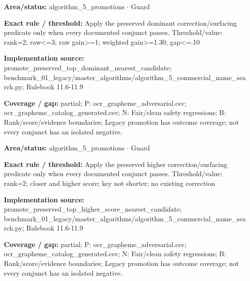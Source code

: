 \begin{tcolorbox}[enhanced,breakable,colback=white,colframe=Muted!45,boxrule=0.45pt,arc=1.5pt,left=6pt,right=6pt,top=5pt,bottom=5pt,title={\texttt{A5-PROMOTE-PRESERVED-DOMINANT}},title after break={\texttt{A5-PROMOTE-PRESERVED-DOMINANT}\ (continued)},fonttitle=\headingfont\bfseries\color{Navy},coltitle=Navy]
\textbf{Area/status:} algorithm\_\allowbreak{}5\_\allowbreak{}promotions $\boldsymbol{\cdot}$ Guard\par
\smallskip
\textbf{Exact rule / threshold:} Apply the preserved dominant correction/\allowbreak{}surfacing predicate only when every documented conjunct passes. Threshold/\allowbreak{}value: rank=2; raw<=3; raw gain>=1; weighted gain>=1.30; gap<=.10\par
\smallskip
\textbf{Implementation source:} promote\_\allowbreak{}preserved\_\allowbreak{}top\_\allowbreak{}dominant\_\allowbreak{}nearest\_\allowbreak{}candidate; benchmark\_\allowbreak{}01\_\allowbreak{}legacy/\allowbreak{}master\_\allowbreak{}algorithms/\allowbreak{}algorithm\_\allowbreak{}5\_\allowbreak{}commercial\_\allowbreak{}name\_\allowbreak{}search.py; Rulebook 11.6-11.9\par
\smallskip
\textbf{Coverage / gap:} partial; P: ocr\_\allowbreak{}grapheme\_\allowbreak{}adversarial.csv; ocr\_\allowbreak{}grapheme\_\allowbreak{}catalog\_\allowbreak{}generated.csv; N: Fair/\allowbreak{}clean safety regressions; B: Rank/\allowbreak{}score/\allowbreak{}evidence boundaries; Legacy promotion has outcome coverage; not every conjunct has an isolated negative.
\end{tcolorbox}
\begin{tcolorbox}[enhanced,breakable,colback=white,colframe=Muted!45,boxrule=0.45pt,arc=1.5pt,left=6pt,right=6pt,top=5pt,bottom=5pt,title={\texttt{A5-PROMOTE-PRESERVED-HIGHER}},title after break={\texttt{A5-PROMOTE-PRESERVED-HIGHER}\ (continued)},fonttitle=\headingfont\bfseries\color{Navy},coltitle=Navy]
\textbf{Area/status:} algorithm\_\allowbreak{}5\_\allowbreak{}promotions $\boldsymbol{\cdot}$ Guard\par
\smallskip
\textbf{Exact rule / threshold:} Apply the preserved higher correction/\allowbreak{}surfacing predicate only when every documented conjunct passes. Threshold/\allowbreak{}value: rank=2; closer and higher score; key not shorter; no existing correction\par
\smallskip
\textbf{Implementation source:} promote\_\allowbreak{}preserved\_\allowbreak{}top\_\allowbreak{}higher\_\allowbreak{}score\_\allowbreak{}nearest\_\allowbreak{}candidate; benchmark\_\allowbreak{}01\_\allowbreak{}legacy/\allowbreak{}master\_\allowbreak{}algorithms/\allowbreak{}algorithm\_\allowbreak{}5\_\allowbreak{}commercial\_\allowbreak{}name\_\allowbreak{}search.py; Rulebook 11.6-11.9\par
\smallskip
\textbf{Coverage / gap:} partial; P: ocr\_\allowbreak{}grapheme\_\allowbreak{}adversarial.csv; ocr\_\allowbreak{}grapheme\_\allowbreak{}catalog\_\allowbreak{}generated.csv; N: Fair/\allowbreak{}clean safety regressions; B: Rank/\allowbreak{}score/\allowbreak{}evidence boundaries; Legacy promotion has outcome coverage; not every conjunct has an isolated negative.
\end{tcolorbox}
